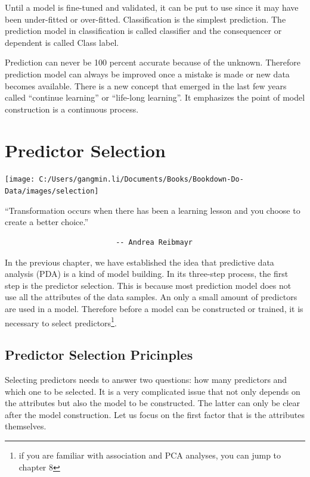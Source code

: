 \documentclass[
]{book}
\renewenvironment{quote}{\begin{VF}}{\end{VF}}
\begin{document}
Until a model is fine-tuned and validated, it can be put to use since it may have been under-fitted or over-fitted. Classification is the simplest prediction. The prediction model in classification is called classifier and the consequencer or dependent is called Class label.

Prediction can never be 100 percent accurate because of the unknown. Therefore prediction model can always be improved once a mistake is made or new data becomes available. There is a new concept that emerged in the last few years called ``continue learning'' or ``life-long learning''. It emphasizes the point of model construction is a continuous process.

\hypertarget{predictor-selection-1}{%
\chapter{Predictor Selection}\label{predictor-selection-1}}

\begin{center}\texttt{[image: C:/Users/gangmin.li/Documents/Books/Bookdown-Do-Data/images/selection]} \end{center}

\begin{quote}
``Transformation occurs when there has been a learning lesson and you choose to create a better choice.''

\begin{verbatim}
                          -- Andrea Reibmayr 
\end{verbatim}
\end{quote}

In the previous chapter, we have established the idea that predictive data analysis (PDA) is a kind of model building. In its three-step process, the first step is the predictor selection. This is because most prediction model does not use all the attributes of the data samples. An only a small amount of predictors are used in a model. Therefore before a model can be constructed or trained, it is necessary to select predictors\footnote{if you are familiar with association and PCA analyses, you can jump to chapter 8}.

\hypertarget{predictor-selection-pricinples}{%
\section{Predictor Selection Pricinples}\label{predictor-selection-pricinples}}

Selecting predictors needs to answer two questions: how many predictors and which one to be selected. It is a very complicated issue that not only depends on the attributes but also the model to be constructed. The latter can only be clear after the model construction. Let us focus on the first factor that is the attributes themselves.
\end{document}
